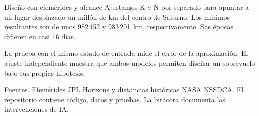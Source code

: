 \documentclass[aspectratio=169,11pt]{beamer}
\begin{document}
\begin{frame}{Diseño con efemérides y alcance}
Ajustamos K y N por separado para apuntar a un lugar desplazado un millón de km del centro de Saturno. Los mínimos resultantes son de unos 982\,452 y 983\,201 km, respectivamente. Sus épocas difieren en casi 16 días.
\medskip

La prueba con el mismo estado de entrada mide el error de la aproximación. El ajuste independiente muestra que ambos modelos permiten diseñar un sobrevuelo bajo sus propias hipótesis.
\medskip

\footnotesize Fuentes. Efemérides JPL Horizons y distancias históricas NASA NSSDCA. El repositorio contiene código, datos y pruebas. La bitácora documenta las intervenciones de IA.
\end{frame}
\end{document}
